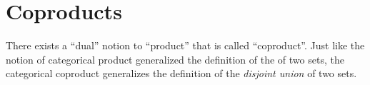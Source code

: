 
\section{Coproducts}
\label{sec:coproductset}


There exists a ``dual'' notion to ``product'' that is called ``coproduct''.
Just like the notion of categorical product generalized the definition of the  of two sets, the categorical coproduct generalizes the definition of the \emph{disjoint union} of two sets.
%
%
%
